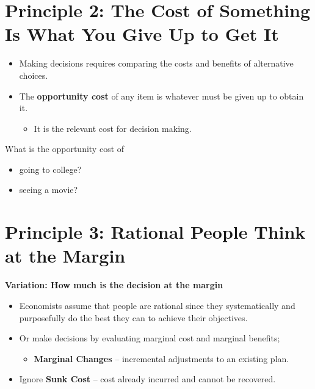 \documentclass[
]{book}
\providecommand{\tightlist}{%
  \setlength{\itemsep}{0pt}\setlength{\parskip}{0pt}}
\begin{document}
\hypertarget{principle-2-the-cost-of-something-is-what-you-give-up-to-get-it}{%
\section{Principle 2: The Cost of Something Is What You Give Up to Get It}\label{principle-2-the-cost-of-something-is-what-you-give-up-to-get-it}}

\begin{itemize}
\item
  Making decisions requires comparing the costs and benefits of alternative choices.
\item
  The \textbf{\color{red} opportunity cost} of any item is whatever must be given up to obtain it.

  \begin{itemize}
  \tightlist
  \item
    It is the relevant cost for decision making.
  \end{itemize}
\end{itemize}

What is the opportunity cost of

\begin{itemize}
\item
  going to college?
\item
  seeing a movie?
\end{itemize}

\hypertarget{principle-3-rational-people-think-at-the-margin}{%
\section{Principle 3: Rational People Think at the Margin}\label{principle-3-rational-people-think-at-the-margin}}

\textbf{Variation: How much is the decision at the margin}

\begin{itemize}
\item
  Economists assume that people are rational since they systematically and purposefully do the best they can to achieve their objectives.
\item
  Or make decisions by evaluating marginal cost and marginal benefits;

  \begin{itemize}
  \tightlist
  \item
    \textbf{Marginal Changes} -- incremental adjustments to an existing plan.
  \end{itemize}
\item
  Ignore \textbf{Sunk Cost} -- cost already incurred and cannot be recovered.
\end{itemize}
\end{document}
